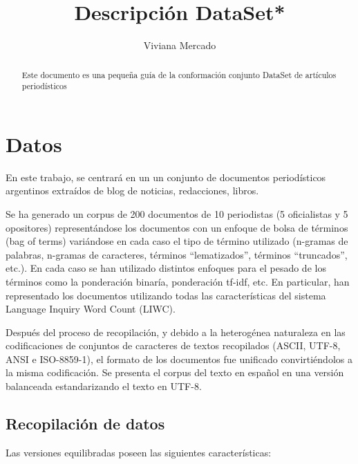 \documentclass[a4paper,10pt]{article}
\title{Descripción DataSet*}
\author{Viviana Mercado}
\begin{document}
\maketitle

\begin{abstract}
Este documento es una pequeña guía de la conformación conjunto DataSet de artículos periodísticos 
\end{abstract}

\tableofcontents
\listoftables 	%
\listoffigures 	%


\section{Datos}

En este trabajo, se centrará en un un conjunto de documentos periodísticos argentinos extraídos de blog de noticias, redacciones, libros. 

Se ha generado un corpus de 200 documentos de 10 periodistas (5 oficialistas y 5 opositores) representándose los documentos con un enfoque de bolsa de términos (bag of terms) variándose en cada caso el tipo de término utilizado (n-gramas de palabras, n-gramas de caracteres, términos “lematizados”, términos “truncados”, etc.). 
En cada caso se han utilizado distintos enfoques para el pesado de los términos como la ponderación binaría, ponderación tf-idf, etc. 
En particular, han representado los documentos utilizando todas las características del sistema Language Inquiry Word Count (LIWC).

Después del proceso de recopilación, y debido a la heterogénea naturaleza en las codificaciones de conjuntos de caracteres de textos recopilados (ASCII, UTF-8, ANSI e ISO-8859-1), el formato de los documentos fue unificado convirtiéndolos a la misma codificación.
Se presenta el corpus del texto en español en una versión balanceada estandarizando el texto en UTF-8.

\subsection{Recopilación de datos}
Las versiones equilibradas poseen las siguientes características: 
\end{document}
